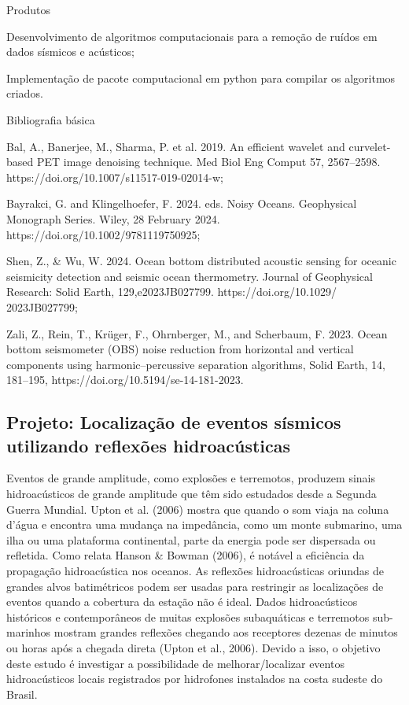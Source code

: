 \documentclass[10pt,a4paper,oneside]{book}
\begin{document}
\begin{fancyenum}{\faShoppingCart}{Produtos}
	\item Desenvolvimento de algoritmos computacionais para a remoção de ruídos em dados sísmicos e acústicos;
	\item Implementação de pacote computacional em python para compilar os algoritmos criados.
\end{fancyenum}

\begin{fancyenum}{\faBook}{Bibliografia básica}
	\item Bal, A., Banerjee, M., Sharma, P. et al. 2019. An efficient wavelet and curvelet-based PET image denoising technique. Med Biol Eng Comput 57, 2567–2598. https://doi.org/10.1007/s11517-019-02014-w;
	\item Bayrakci, G. and Klingelhoefer, F. 2024. eds. Noisy Oceans. Geophysical Monograph Series. Wiley, 28 February 2024. https://doi.org/10.1002/9781119750925;
	\item Shen, Z., \& Wu, W. 2024. Ocean bottom distributed acoustic sensing for oceanic seismicity detection and seismic ocean thermometry. Journal of Geophysical Research: Solid Earth, 129,e2023JB027799. https://doi.org/10.1029/
2023JB027799;
	\item Zali, Z., Rein, T., Krüger, F., Ohrnberger, M., and Scherbaum, F. 2023. Ocean bottom seismometer (OBS) noise reduction from horizontal and vertical components using harmonic–percussive separation algorithms, Solid Earth, 14, 181–195, https://doi.org/10.5194/se-14-181-2023.
\end{fancyenum}

\subsection{Projeto: Localização de eventos sísmicos utilizando reflexões hidroacústicas}

Eventos de grande amplitude, como explosões e terremotos, produzem sinais hidroacústicos de grande amplitude que têm sido estudados desde a Segunda Guerra Mundial. Upton et al. (2006) mostra que quando o som viaja na coluna d'água e encontra uma mudança na impedância, como um monte submarino, uma ilha ou uma plataforma continental, parte da energia pode ser dispersada ou refletida. Como relata Hanson \& Bowman (2006), é notável a eficiência da propagação hidroacústica nos oceanos. As reflexões hidroacústicas oriundas de grandes alvos batimétricos podem ser usadas para restringir as localizações de eventos quando a cobertura da estação não é ideal. Dados hidroacústicos históricos e contemporâneos de muitas explosões subaquáticas e terremotos sub-marinhos mostram grandes reflexões chegando aos receptores dezenas de minutos ou horas após a chegada direta (Upton et al., 2006). Devido a isso, o objetivo deste estudo é investigar a possibilidade de melhorar/localizar eventos hidroacústicos locais registrados por hidrofones instalados na costa sudeste do Brasil. 
\end{document}

